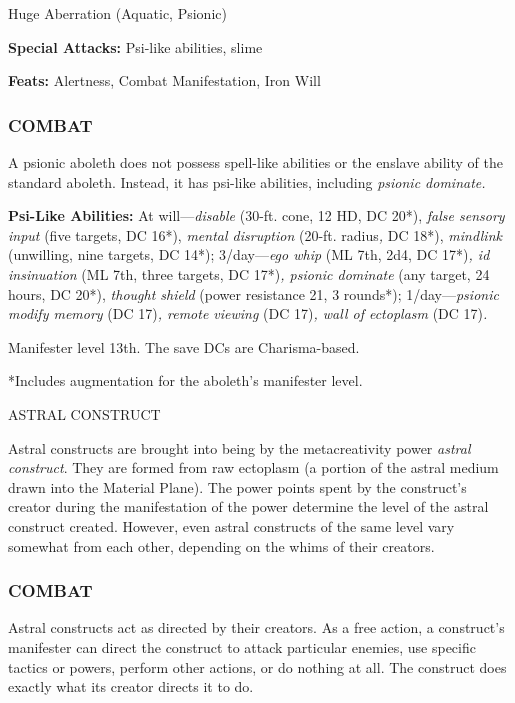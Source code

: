 \documentclass{article}
\begin{document}
Huge Aberration (Aquatic, Psionic)

\textbf{Special Attacks:} Psi-like abilities, slime

\textbf{Feats:} Alertness, Combat Manifestation, Iron Will

\subsubsection*{COMBAT}

A psionic aboleth does not possess spell-like abilities or the enslave ability 
of the standard aboleth. Instead, it has psi-like abilities, including \textit{psionic 
dominate.}

\textbf{Psi-Like Abilities:} At will---\textit{disable }(30-ft. cone, 12 HD, DC 
20*), \textit{false sensory input }(five targets, DC 16*), \textit{mental disruption 
}(20-ft. radius\textit{, }DC 18*), \textit{mindlink }(unwilling, nine targets, 
DC 14*); 3/day---\textit{ego whip }(ML 7th, 2d4, DC 17*)\textit{, id insinuation 
}(ML 7th, three targets, DC 17*)\textit{, psionic dominate }(any target, 24 hours, 
DC 20*), \textit{thought shield }(power resistance 21, 3 rounds*); 1/day---\textit{psionic 
modify memory }(DC 17)\textit{, remote viewing }(DC 17)\textit{, wall of ectoplasm 
}(DC 17)\textit{. }

Manifester level 13th. The save DCs are Charisma-based.

*Includes augmentation for the aboleth's manifester level.

\vspace{12pt}
{\LARGE{}ASTRAL CONSTRUCT}

Astral constructs are brought into being by the metacreativity power \textit{astral 
construct}. They are formed from raw ectoplasm (a portion of the astral medium 
drawn into the Material Plane). The power points spent by the construct's creator 
during the manifestation of the power determine the level of the astral construct 
created. However, even astral constructs of the same level vary somewhat from each 
other, depending on the whims of their creators.

\subsubsection*{COMBAT}

Astral constructs act as directed by their creators. As a free action, a construct's 
manifester can direct the construct to attack particular enemies, use specific 
tactics or powers, perform other actions, or do nothing at all. The construct does 
exactly what its creator directs it to do. 
\end{document}
